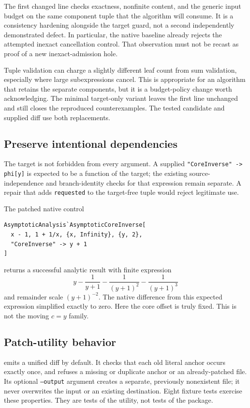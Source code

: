 \documentclass[11pt,letterpaper]{article}
\theoremstyle{remark}\newtheorem{remark}[theorem]{Remark}
\newcommand{\code}[1]{\texttt{#1}}
\newcommand{\file}[1]{\path{#1}}
\begin{document}
The first changed line checks exactness, nonfinite content, and the generic
input budget on the same component tuple that the algorithm will consume.
It is a consistency hardening alongside the target guard, not a second
independently demonstrated defect. In particular, the native baseline already
rejects the attempted inexact cancellation control. That observation must not
be recast as proof of a new inexact-admission hole.

Tuple validation can charge a slightly different leaf count from sum
validation, especially where large subexpressions cancel. This is appropriate
for an algorithm that retains the separate components, but it is a budget-policy
change worth acknowledging. The minimal target-only variant leaves the first
line unchanged and still closes the reproduced counterexamples. The tested
candidate and supplied diff use both replacements.

\subsection{Preserve intentional dependencies}
The target is not forbidden from every argument. A supplied
\code{"CoreInverse" -> phi[y]} is expected to be a function of the target;
the existing source-independence and branch-identity checks for that expression
remain separate. A repair that adds \code{requested} to the target-free tuple
would reject legitimate use.

The patched native control
\begin{lstlisting}
AsymptoticAnalysis`AsymptoticCoreInverse[
  x - 1, 1 + 1/x, {x, Infinity}, {y, 2},
  "CoreInverse" -> y + 1
]
\end{lstlisting}
returns a successful analytic result with finite expression
\[
 y-\frac1{y+1}-\frac1{(y+1)^2}-\frac1{(y+1)^3}
\]
and remainder scale $(y+1)^{-2}$. The native difference from this expected
expression simplified exactly to zero. Here the core offset is truly fixed.
This is not the moving $c=y$ family.

\subsection{Patch-utility behavior}
\file{code/patch_core_validation.py} emits a unified diff by default. It checks
that each old literal anchor occurs exactly once, and refuses a missing or
duplicate anchor or an already-patched file. Its optional \code{--output}
argument creates a separate, previously nonexistent file; it never overwrites
the input or an existing destination. Eight fixture tests exercise these
properties. They are tests of the utility, not tests of the package.
\end{document}
